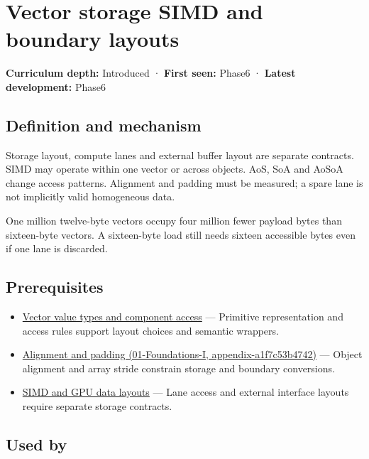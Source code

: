 \hypertarget{appendix-26bf6bf2fb8b}{}
\section{Vector storage SIMD and boundary layouts}\label{appendix-26bf6bf2fb8b-vector-storage-simd-and-boundary-layouts}

\textbf{Curriculum depth:} Introduced · \textbf{First seen:} Phase6 · \textbf{Latest development:} Phase6

\subsection{Definition and mechanism}\label{appendix-26bf6bf2fb8b-definition-and-mechanism}

Storage layout, compute lanes and external buffer layout are separate contracts. SIMD may operate within one vector or across objects. AoS, SoA and AoSoA change access patterns. Alignment and padding must be measured; a spare lane is not implicitly valid homogeneous data.

One million twelve-byte vectors occupy four million fewer payload bytes than sixteen-byte vectors. A sixteen-byte load still needs sixteen accessible bytes even if one lane is discarded.

\subsection{Prerequisites}\label{appendix-26bf6bf2fb8b-prerequisites}

\begin{itemize}
\tightlist
\item
  \hyperref[appendix-37a39984ba66]{Vector value types and component access} --- Primitive representation and access rules support layout choices and semantic wrappers.
\item
  \href{../01-Foundations-I/main.pdf\#nameddest=appendix-a1f7c53b4742}{Alignment and padding (01-Foundations-I, appendix-a1f7c53b4742)} --- Object alignment and array stride constrain storage and boundary conversions.
\item
  \hyperref[appendix-3c7b1a56de01]{SIMD and GPU data layouts} --- Lane access and external interface layouts require separate storage contracts.
\end{itemize}

\subsection{Used by}\label{appendix-26bf6bf2fb8b-used-by}

